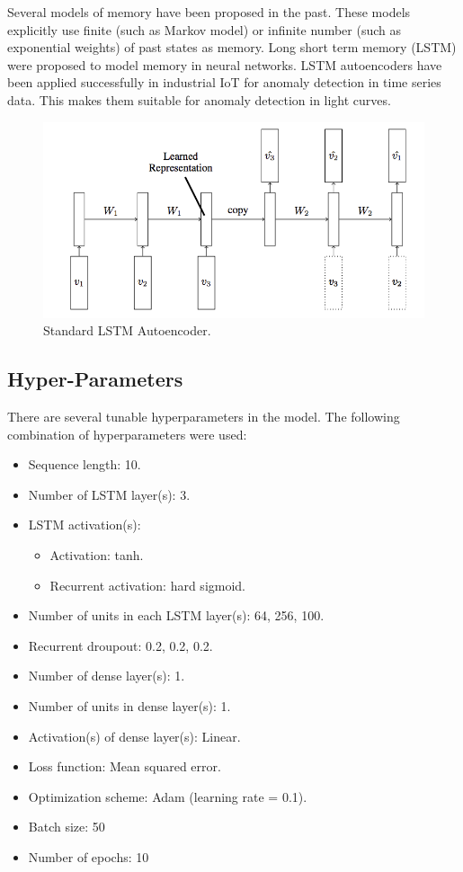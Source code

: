 \documentclass[%
aip,
amsmath,amssymb,
reprint,%
]{revtex4-1}
\begin{document}
Several models of memory have been proposed in the past. These models explicitly use finite (such as Markov model) or infinite number (such as exponential weights) of past states as memory. Long short term memory (LSTM) were proposed to model memory in neural networks. LSTM autoencoders have been applied successfully in industrial IoT for anomaly detection in time series data. This makes them suitable for anomaly detection in light curves.

\begin{figure}[h!]
	\includegraphics[width=\linewidth]{LSTM-Autoencoder-Model.png}
	\caption{Standard LSTM Autoencoder.}
	\label{fig:lstm_autoenc}
\end{figure}

\subsection{Hyper-Parameters}

There are several tunable hyperparameters in the model. The following combination of hyperparameters were used:

\begin{itemize}
  \item Sequence length: 10.
  \item Number of LSTM layer(s): 3.
  \item LSTM activation(s):
  \begin{itemize}
      \item Activation: tanh.
      \item Recurrent activation: hard sigmoid.
  \end{itemize}
  \item Number of units in each LSTM layer(s): 64, 256, 100.
  \item Recurrent droupout: 0.2, 0.2, 0.2.
  \item Number of dense layer(s): 1.
  \item Number of units in dense layer(s): 1.
  \item Activation(s) of dense layer(s): Linear.
  \item Loss function: Mean squared error.
  \item Optimization scheme: Adam (learning rate = 0.1).
  \item Batch size: 50
  \item Number of epochs: 10
\end{itemize}
\end{document}
